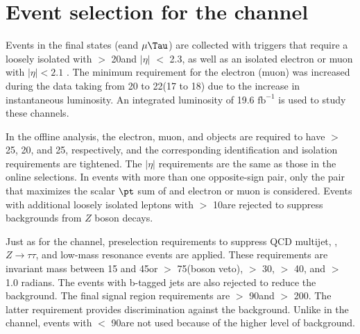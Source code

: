 \section{\texorpdfstring{Event selection for the \leptonTau channel}{Event selection for the lepton-tau channel}}
\label{sect:eleTauCuts}

Events in the \leptonTau final states (e\Tau and $\mu\Tau$) are collected with triggers that require a loosely isolated \Tau with \PT $>$ 20\GeV and $|\eta|$ $<$ 2.3, as well as an isolated electron or muon with $|\eta| < 2.1$ \cite{Chatrchyan:2011nv,Khachatryan:2015hwa,Chatrchyan:2012xi}.  The minimum \PT requirement for the electron (muon) was increased during the data taking from 20 to 22\GeV (17 to 18\GeV) due to the increase in instantaneous luminosity. An integrated luminosity of 19.6 $\mathrm{fb}^{-1}$ is used to study these channels.

In the offline analysis, the electron, muon, and \Tau objects are required to have \PT $>$ 25, 20, and 25\GeV, respectively, 
and the corresponding identification and isolation requirements are tightened. The $|\eta|$ requirements are the same as those in the online selections. In events with more than one opposite-sign \leptonTau pair, only  the pair that maximizes the scalar $\pt$ sum of \Tau and electron or muon is considered.  Events with additional loosely isolated leptons with \PT $>$ 10\GeV are rejected to suppress backgrounds from $Z$ boson decays.  

Just as for the \tauTau channel, preselection requirements to suppress
QCD multijet, \ttbar, $Z \to \tau \tau$, and low-mass resonance events are applied.
These requirements are \leptonTau 
invariant mass between 15 and 45\GeV or $>$ 75\GeV (\Z boson veto), \MPT $>$ 30\GeV, \mttwo $>$ 40\GeV, 
and \deltaphi $>$ 1.0 radians. 
The events with b-tagged jets are also rejected to reduce the \ttbar background.
 The final signal region requirements are \mttwo $>$ 90\GeV and \tauMT $>$ 200\GeV. %
The latter requirement provides discrimination against the \wjets background.  Unlike in the \tauTau channel,
events with \mttwo $<$ 90\GeV are not used because of the higher 
level of background. 


